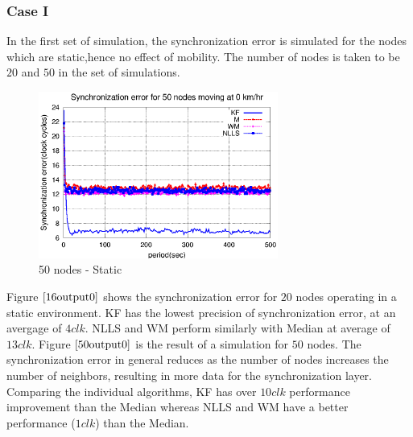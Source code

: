 \documentclass[a4paper,10pt]{report}
\begin{document}
\subsubsection{\textbf{Case I}} In the first set of simulation, the synchronization error is simulated for the nodes which are static,hence no effect of mobility. The number of nodes is taken to be $20$ and $50$ in the set of simulations.  \newline
\begin{figure}
\centering
\includegraphics[width=0.7\textwidth]{50output-s0}
\caption{50 nodes - Static} \label{50output0}
\end{figure}
Figure $\ref{16output0}$ shows the synchronization error for $20$ nodes operating in a static environment. KF has the lowest
precision of synchronization error, at an avergage of $4clk$. NLLS and WM perform similarly with Median at average of $13clk$. \newline 
Figure $\ref{50output0}$ is the result of a simulation for $50$ nodes. The synchronization error in general reduces as the number of nodes increases the number of neighbors, resulting in more data for the synchronization layer. Comparing the individual algorithms, KF has over $10clk$ performance improvement than the Median whereas NLLS and WM have a better performance ($1clk$) than the Median.
\end{document}
